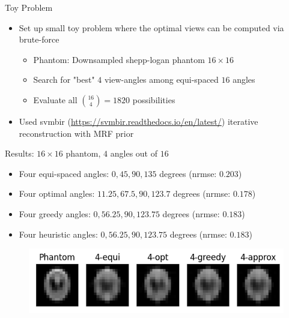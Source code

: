 \documentclass[english,aspectratio=43]{beamer}
\begin{document}
\begin{frame}{Toy Problem}
	\begin{itemize}
	    \setlength\itemsep{2em}
		\item Set up small toy problem where the optimal views can be computed via brute-force
		\begin{itemize}
		    \item Phantom: Downsampled shepp-logan phantom $16\times16$
		    \item Search for "best" $4$ view-angles among equi-spaced $16$ angles
		    \item Evaluate all ${16 \choose 4} = 1820$ possibilities
	    \end{itemize}
		
		
	    \item Used svmbir (\url{https://svmbir.readthedocs.io/en/latest/}) iterative reconstruction with MRF prior
	    
        
	\end{itemize}
	
\end{frame}


\begin{frame}{Results: $16 \times 16$ phantom, $4$ angles out of $16$ }
	\begin{itemize}
	    \item Four equi-spaced angles: $0, 45, 90, 135$ degrees (nrmse: $0.203$)
	    \item Four optimal angles: $11.25, 67.5, 90, 123.7$ degrees (nrmse: $0.178$)
	    \item Four greedy angles: $0, 56.25, 90, 123.75$ degrees (nrmse: $0.183$)
	    \item Four heuristic angles: $0, 56.25, 90, 123.75$ degrees (nrmse: $0.183$)
        
	\end{itemize}
	
	\begin{figure}
    \includegraphics[scale=0.9]{Figs/plot_recon_compare3.png}
    \end{figure}
	
\end{frame}
\end{document}

